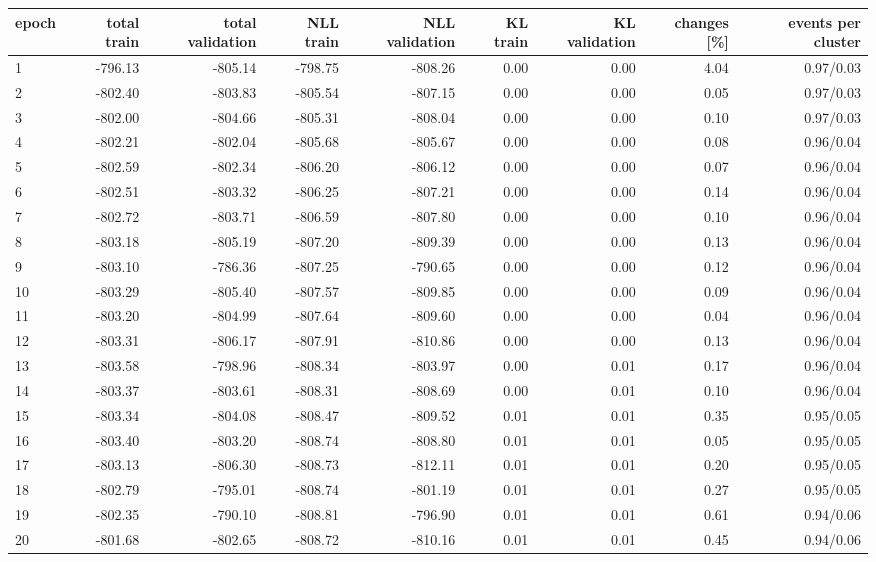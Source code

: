 \begin{tabular}{lrrrrrrrr}
\hline
epoch & total train & total validation & NLL train & NLL validation & KL train & KL validation & changes [\%] & events per cluster \\
\hline
1 & -796.13 & -805.14 & -798.75 & -808.26 & 0.00 & 0.00 & 4.04 & 0.97/0.03 \\
2 & -802.40 & -803.83 & -805.54 & -807.15 & 0.00 & 0.00 & 0.05 & 0.97/0.03 \\
3 & -802.00 & -804.66 & -805.31 & -808.04 & 0.00 & 0.00 & 0.10 & 0.97/0.03 \\
4 & -802.21 & -802.04 & -805.68 & -805.67 & 0.00 & 0.00 & 0.08 & 0.96/0.04 \\
5 & -802.59 & -802.34 & -806.20 & -806.12 & 0.00 & 0.00 & 0.07 & 0.96/0.04 \\
6 & -802.51 & -803.32 & -806.25 & -807.21 & 0.00 & 0.00 & 0.14 & 0.96/0.04 \\
7 & -802.72 & -803.71 & -806.59 & -807.80 & 0.00 & 0.00 & 0.10 & 0.96/0.04 \\
8 & -803.18 & -805.19 & -807.20 & -809.39 & 0.00 & 0.00 & 0.13 & 0.96/0.04 \\
9 & -803.10 & -786.36 & -807.25 & -790.65 & 0.00 & 0.00 & 0.12 & 0.96/0.04 \\
10 & -803.29 & -805.40 & -807.57 & -809.85 & 0.00 & 0.00 & 0.09 & 0.96/0.04 \\
11 & -803.20 & -804.99 & -807.64 & -809.60 & 0.00 & 0.00 & 0.04 & 0.96/0.04 \\
12 & -803.31 & -806.17 & -807.91 & -810.86 & 0.00 & 0.00 & 0.13 & 0.96/0.04 \\
13 & -803.58 & -798.96 & -808.34 & -803.97 & 0.00 & 0.01 & 0.17 & 0.96/0.04 \\
14 & -803.37 & -803.61 & -808.31 & -808.69 & 0.00 & 0.01 & 0.10 & 0.96/0.04 \\
15 & -803.34 & -804.08 & -808.47 & -809.52 & 0.01 & 0.01 & 0.35 & 0.95/0.05 \\
16 & -803.40 & -803.20 & -808.74 & -808.80 & 0.01 & 0.01 & 0.05 & 0.95/0.05 \\
17 & -803.13 & -806.30 & -808.73 & -812.11 & 0.01 & 0.01 & 0.20 & 0.95/0.05 \\
18 & -802.79 & -795.01 & -808.74 & -801.19 & 0.01 & 0.01 & 0.27 & 0.95/0.05 \\
19 & -802.35 & -790.10 & -808.81 & -796.90 & 0.01 & 0.01 & 0.61 & 0.94/0.06 \\
20 & -801.68 & -802.65 & -808.72 & -810.16 & 0.01 & 0.01 & 0.45 & 0.94/0.06 \\

\end{tabular}
